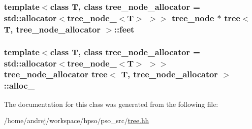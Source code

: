 \hypertarget{classtree_e1dbb80115ba483e37d081a2256c239b}{
\subsubsection{\setlength{\rightskip}{0pt plus 5cm}template$<$class T, class tree\_\-node\_\-allocator = std::allocator$<$tree\_\-node\_\-$<$T$>$ $>$$>$ {\bf tree\_\-node} $\ast$ {\bf tree}$<$ T, tree\_\-node\_\-allocator $>$::{\bf feet}}}
\label{classtree_e1dbb80115ba483e37d081a2256c239b}


\hypertarget{classtree_6bc0fbe7b7be665799592b513d307f17}{
\subsubsection{\setlength{\rightskip}{0pt plus 5cm}template$<$class T, class tree\_\-node\_\-allocator = std::allocator$<$tree\_\-node\_\-$<$T$>$ $>$$>$ tree\_\-node\_\-allocator {\bf tree}$<$ T, tree\_\-node\_\-allocator $>$::{\bf alloc\_\-}}}
\label{classtree_6bc0fbe7b7be665799592b513d307f17}




The documentation for this class was generated from the following file:\begin{CompactItemize}
\item 
/home/andrej/workspace/hpso/pso\_\-src/\hyperlink{tree_8hh}{tree.hh}\end{CompactItemize}
